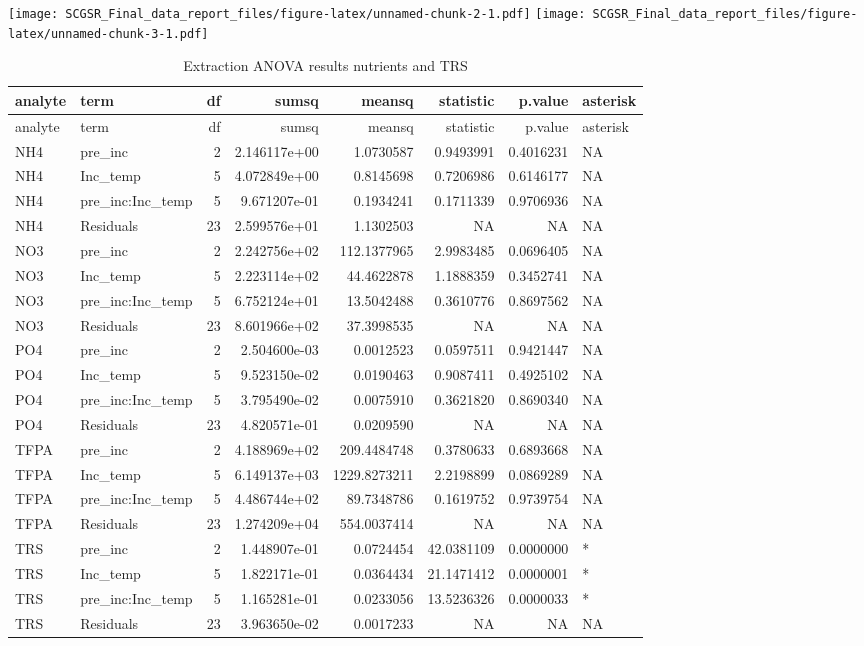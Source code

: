\documentclass[
]{article}
\begin{document}
\texttt{[image: SCGSR\_Final\_data\_report\_files/figure-latex/unnamed-chunk-2-1.pdf]}
\texttt{[image: SCGSR\_Final\_data\_report\_files/figure-latex/unnamed-chunk-3-1.pdf]}

\begin{longtable}[]{@{}llrrrrrl@{}}
\caption{Extraction ANOVA results nutrients and TRS}\tabularnewline
\toprule()
analyte & term & df & sumsq & meansq & statistic & p.value & asterisk \\
\midrule()
\endfirsthead
\toprule()
analyte & term & df & sumsq & meansq & statistic & p.value & asterisk \\
\midrule()
\endhead
NH4 & pre\_inc & 2 & 2.146117e+00 & 1.0730587 & 0.9493991 & 0.4016231 &
NA \\
NH4 & Inc\_temp & 5 & 4.072849e+00 & 0.8145698 & 0.7206986 & 0.6146177 &
NA \\
NH4 & pre\_inc:Inc\_temp & 5 & 9.671207e-01 & 0.1934241 & 0.1711339 &
0.9706936 & NA \\
NH4 & Residuals & 23 & 2.599576e+01 & 1.1302503 & NA & NA & NA \\
NO3 & pre\_inc & 2 & 2.242756e+02 & 112.1377965 & 2.9983485 & 0.0696405
& NA \\
NO3 & Inc\_temp & 5 & 2.223114e+02 & 44.4622878 & 1.1888359 & 0.3452741
& NA \\
NO3 & pre\_inc:Inc\_temp & 5 & 6.752124e+01 & 13.5042488 & 0.3610776 &
0.8697562 & NA \\
NO3 & Residuals & 23 & 8.601966e+02 & 37.3998535 & NA & NA & NA \\
PO4 & pre\_inc & 2 & 2.504600e-03 & 0.0012523 & 0.0597511 & 0.9421447 &
NA \\
PO4 & Inc\_temp & 5 & 9.523150e-02 & 0.0190463 & 0.9087411 & 0.4925102 &
NA \\
PO4 & pre\_inc:Inc\_temp & 5 & 3.795490e-02 & 0.0075910 & 0.3621820 &
0.8690340 & NA \\
PO4 & Residuals & 23 & 4.820571e-01 & 0.0209590 & NA & NA & NA \\
TFPA & pre\_inc & 2 & 4.188969e+02 & 209.4484748 & 0.3780633 & 0.6893668
& NA \\
TFPA & Inc\_temp & 5 & 6.149137e+03 & 1229.8273211 & 2.2198899 &
0.0869289 & NA \\
TFPA & pre\_inc:Inc\_temp & 5 & 4.486744e+02 & 89.7348786 & 0.1619752 &
0.9739754 & NA \\
TFPA & Residuals & 23 & 1.274209e+04 & 554.0037414 & NA & NA & NA \\
TRS & pre\_inc & 2 & 1.448907e-01 & 0.0724454 & 42.0381109 & 0.0000000 &
* \\
TRS & Inc\_temp & 5 & 1.822171e-01 & 0.0364434 & 21.1471412 & 0.0000001
& * \\
TRS & pre\_inc:Inc\_temp & 5 & 1.165281e-01 & 0.0233056 & 13.5236326 &
0.0000033 & * \\
TRS & Residuals & 23 & 3.963650e-02 & 0.0017233 & NA & NA & NA \\
\bottomrule()
\end{longtable}
\end{document}
